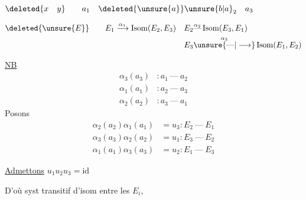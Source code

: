 $\deleted{x\quad y}\qquad a_1\quad \deleted{\unsure{a}}\unsure{b|a}_2\quad a_3$

\[
\begin{aligned}
\deleted{\unsure{E}} \qquad E_1&\xrightarrow{\alpha_1}\operatorname{Isom}(E_2,E_3)&
E_2&\overset{\alpha_2}{\text{---}}\operatorname{Isom}(E_3,E_1)\\
&&E_3&\overset{\alpha_3}{\unsure{\text{---}|\longrightarrow}}\operatorname{Isom}(E_1,E_2)
\end{aligned}
\]


\uline{NB}
\[
\begin{aligned}
\alpha_3(a_3)&:a_1\ \text{---}\ a_2\\
\alpha_1(a_1)&:a_2\ \text{---}\ a_3\\
\alpha_2(a_2)&:a_3\ \text{---}\ a_1
\end{aligned}
\]
 Posons
\[
\begin{aligned}
\alpha_2(a_2)\alpha_1(a_1)&=u_3:E_2\ \text{---}\ E_1\\
\alpha_3(a_3)\alpha_2(a_2)&=u_1:E_3\ \text{---}\ E_2\\
\alpha_1(a_1)\alpha_3(a_3)&=u_2:E_1\ \text{---}\ E_3
\end{aligned}
\]

\uline{Admettons} \qquad $\boxed{u_1 u_2 u_3=\mathrm{id}}$


D'où syst transitif d'isom entre les $E_i$,
